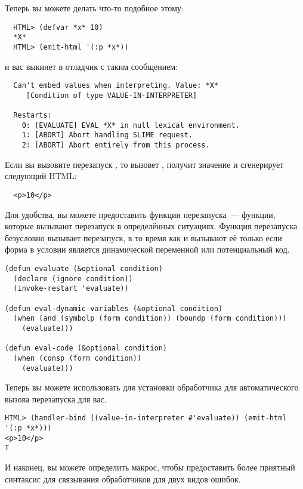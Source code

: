 Теперь вы можете делать что-то подобное этому:

\begin{verbatim}
  HTML> (defvar *x* 10)
  *X*
  HTML> (emit-html '(:p *x*))
\end{verbatim}

и вас выкинет в отладчик с таким сообщением:

\begin{verbatim}
  Can't embed values when interpreting. Value: *X*
     [Condition of type VALUE-IN-INTERPRETER]

  Restarts:
    0: [EVALUATE] EVAL *X* in null lexical environment.
    1: [ABORT] Abort handling SLIME request.
    2: [ABORT] Abort entirely from this process.
\end{verbatim}

Если вы вызовите перезапуск , то  вызовет , получит значение  и сгенерирует следующий HTML:

\begin{verbatim}
  <p>10</p>
\end{verbatim}

Для удобства, вы можете предоставить функции перезапуска~--- функции, которые вызывают
 перезапуск в определённых ситуациях. Функция  перезапуска
безусловно вызывает перезапуск, в то время как  и
 вызывают её только если форма в условии является динамической переменной
или потенциальный код.

\begin{lstlisting}
(defun evaluate (&optional condition)
  (declare (ignore condition))
  (invoke-restart 'evaluate))

(defun eval-dynamic-variables (&optional condition)
  (when (and (symbolp (form condition)) (boundp (form condition)))
    (evaluate)))

(defun eval-code (&optional condition)
  (when (consp (form condition))
    (evaluate)))
\end{lstlisting}

Теперь вы можете использовать  для установки обработчика для
автоматического вызова  перезапуска для вас.

\begin{lstlisting}
HTML> (handler-bind ((value-in-interpreter #'evaluate)) (emit-html '(:p *x*)))
<p>10</p>
T
\end{lstlisting}

И наконец, вы можете определить макрос, чтобы предоставить более приятный синтаксис для
связывания обработчиков для двух видов ошибок.


